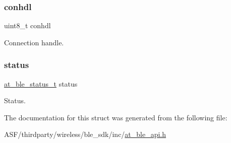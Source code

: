 \subsubsection{\texorpdfstring{conhdl}{conhdl}}
{\footnotesize\ttfamily uint8\+\_\+t conhdl}



Connection handle. 

\mbox{\label{structat__ble__htpt__enable__rsp__t_a0b48093fc2030779fc47e5216f8019e2}} 
\subsubsection{\texorpdfstring{status}{status}}
{\footnotesize\ttfamily \mbox{\hyperlink{group__error__codes__group_ga3b1db9b95feb157b3c188ca27fe76988}{at\+\_\+ble\+\_\+status\+\_\+t}} status}



Status. 



The documentation for this struct was generated from the following file\+:\begin{DoxyCompactItemize}
\item 
A\+S\+F/thirdparty/wireless/ble\+\_\+sdk/inc/\mbox{\hyperlink{at__ble__api_8h}{at\+\_\+ble\+\_\+api.\+h}}\end{DoxyCompactItemize}
